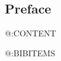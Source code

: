 \documentclass[justified,sixbynine,notoc]{tufte-book}
\begin{document}
\setlength{\cftparskip}{\baselineskip}
\tableofcontents

\mainmatter
\begin{fullwidth}


\chapter*{Preface}

@:CONTENT

\end{fullwidth}

\backmatter
\printindex

\begin{thebibliography}{999}
@:BIBITEMS
\end{thebibliography}
\end{document}

